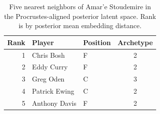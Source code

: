 \begin{table}[htbp]
  \centering\small
  \begin{tabular}{rllc}
    \toprule
    Rank & Player & Position & Archetype \\
    \midrule
    1 & Chris Bosh & F & 2 \\
    2 & Eddy Curry & F & 2 \\
    3 & Greg Oden & C & 3 \\
    4 & Patrick Ewing & C & 2 \\
    5 & Anthony Davis & F & 2 \\
    \bottomrule
  \end{tabular}
  \caption{Five nearest neighbors of Amar'e Stoudemire in the Procrustes-aligned posterior latent space. Rank is by posterior mean embedding distance.}
  \label{tab:Amar_e_Stoudemire_neighbors}
\end{table}

